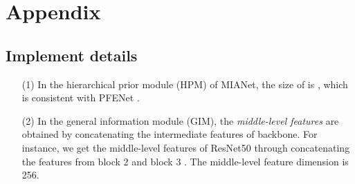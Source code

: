 \documentclass[10pt,twocolumn,letterpaper]{article}
\begin{document}
{\small


}


\clearpage
\appendix
\section{Appendix}
\subsection{Implement details}
\begin{itemize}[itemsep=1pt,topsep=0pt,parsep=0pt]
	\item [(1)] In the hierarchical prior module (HPM) of MIANet, the size of  is , which is consistent with PFENet \cite{pfenet}.
	\item [(2)] In the general information module (GIM), the \textit{middle-level features} are obtained by concatenating the intermediate features of backbone. For instance, we get the middle-level features of ResNet50 through concatenating the features from block 2 and block 3 \cite{canet}. The middle-level feature dimension  is 256.
\end{itemize}
\end{document}
